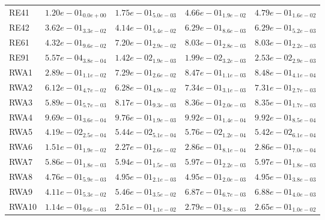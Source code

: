 \documentclass{article}
\begin{document}
\begin{table}
\begin{scriptsize}
\begin{tabular}{lllll}
RE41 & $  1.20e-01_{ 0.0e+00}$ & $  1.75e-01_{ 5.0e-03}$ & \cellcolor{gray25}$  4.66e-01_{ 1.9e-02}$ & \cellcolor{gray95}$  4.79e-01_{ 1.6e-02}$ \\
RE42 & $  3.62e-01_{ 3.3e-02}$ & $  4.14e-01_{ 5.4e-02}$ & \cellcolor{gray95}$  6.29e-01_{ 8.6e-03}$ & \cellcolor{gray25}$  6.29e-01_{ 5.2e-03}$ \\
RE61 & $  4.32e-01_{ 9.6e-02}$ & $  7.20e-01_{ 2.9e-02}$ & \cellcolor{gray95}$  8.03e-01_{ 2.8e-03}$ & \cellcolor{gray25}$  8.03e-01_{ 2.2e-03}$ \\
RE91 & $  5.57e-04_{ 3.8e-04}$ & $  1.42e-02_{ 1.9e-03}$ & \cellcolor{gray25}$  1.99e-02_{ 3.2e-03}$ & \cellcolor{gray95}$  2.53e-02_{ 2.9e-03}$ \\
RWA1 & $  2.89e-01_{ 1.1e-02}$ & $  7.29e-01_{ 2.6e-02}$ & \cellcolor{gray25}$  8.47e-01_{ 1.1e-03}$ & \cellcolor{gray95}$  8.48e-01_{ 4.1e-04}$ \\
RWA2 & $  6.12e-01_{ 4.7e-02}$ & $  6.28e-01_{ 4.9e-02}$ & \cellcolor{gray95}$  7.34e-01_{ 3.1e-03}$ & \cellcolor{gray25}$  7.31e-01_{ 2.7e-03}$ \\
RWA3 & $  5.89e-01_{ 5.7e-03}$ & $  8.17e-01_{ 9.3e-03}$ & \cellcolor{gray95}$  8.36e-01_{ 2.0e-03}$ & \cellcolor{gray25}$  8.35e-01_{ 1.7e-03}$ \\
RWA4 & $  9.69e-01_{ 3.6e-04}$ & $  9.76e-01_{ 1.9e-03}$ & \cellcolor{gray95}$  9.92e-01_{ 1.4e-04}$ & \cellcolor{gray25}$  9.92e-01_{ 8.5e-04}$ \\
RWA5 & $  4.19e-02_{ 2.5e-04}$ & \cellcolor{gray25}$  5.44e-02_{ 5.1e-04}$ & \cellcolor{gray95}$  5.76e-02_{ 1.2e-04}$ & $  5.42e-02_{ 6.1e-04}$ \\
RWA6 & $  1.51e-01_{ 1.9e-02}$ & $  2.27e-01_{ 2.6e-02}$ & \cellcolor{gray25}$  2.86e-01_{ 8.1e-04}$ & \cellcolor{gray95}$  2.86e-01_{ 7.0e-04}$ \\
RWA7 & $  5.86e-01_{ 1.8e-03}$ & $  5.94e-01_{ 1.5e-03}$ & \cellcolor{gray95}$  5.97e-01_{ 2.2e-03}$ & \cellcolor{gray25}$  5.97e-01_{ 1.8e-03}$ \\
RWA8 & $  4.76e-01_{ 5.9e-03}$ & \cellcolor{gray25}$  4.95e-01_{ 2.1e-03}$ & $  4.95e-01_{ 2.0e-03}$ & \cellcolor{gray95}$  4.95e-01_{ 3.8e-03}$ \\
RWA9 & $  4.11e-01_{ 5.3e-02}$ & $  5.46e-01_{ 3.5e-02}$ & \cellcolor{gray25}$  6.87e-01_{ 6.7e-03}$ & \cellcolor{gray95}$  6.88e-01_{ 4.0e-03}$ \\
RWA10 & $  1.14e-01_{ 9.6e-03}$ & $  2.51e-01_{ 1.1e-02}$ & \cellcolor{gray95}$  2.79e-01_{ 3.8e-03}$ & \cellcolor{gray25}$  2.65e-01_{ 1.0e-02}$ \\
\hline
\end{tabular}
\end{scriptsize}
\end{table}
\end{document}
